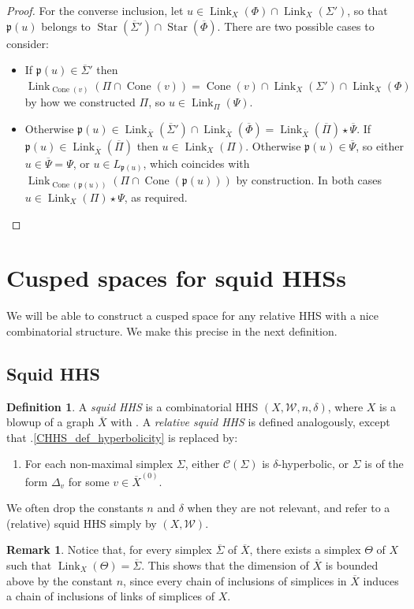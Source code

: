 \documentclass[svgnames]{amsart}
\theoremstyle{plain}
\theoremstyle{definition}
\newtheorem{defn}[thm]{Definition}
\newtheorem{rem}[thm]{Remark}
\newcommand{\C}[1]{\mathcal{C}(#1)}
\newcommand{\link}[2]{\operatorname{Link}_{#1}\left(#2\right)}
\newcommand{\W}{\mathcal{W}}
\newcommand{\CStar}[1]{\operatorname{Star}\left(#1\right)}
\newcommand{\p}{\mathfrak{p}}
\newcommand{\Cone}[1]{\operatorname{Cone}\left(#1\right)}
\newcommand{\squid}[1]{squid}
\newcommand{\Squid}[1]{Squid}
\newcommand{\ov}[1]{\overline{#1}}
\begin{document}
\begin{proof}
For the converse inclusion, let $u\in \link{X}{\Phi}\cap\link{X}{\Sigma'}$, so that $\p(u)$ belongs to $\CStar { \ov \Sigma'}\cap \CStar { \ov \Phi}$. There are two possible cases to consider:
\begin{itemize}
    \item If $\p(u)\in \ov \Sigma'$ then $\link{\Cone{v}}{\Pi\cap \Cone{v}}=\Cone{v}\cap\link{X}{\Sigma'}\cap\link{X}{\Phi}$ by how we constructed $\Pi$, so $u\in \link{\Pi}{\Psi}$.
    \item Otherwise $\p(u)\in  \link{\ov X}{\ov \Sigma'}\cap \link{\ov X}{\ov \Phi}=\link{\ov X}{\ov \Pi}\star\ov\Psi$. If $\p(u)\in \link{\ov X}{\ov \Pi}$ then $u\in \link{X}{\Pi}$. Otherwise $\p(u)\in\ov\Psi$, so either $u\in \ov\Psi=\Psi$, or $u\in L_{\p(u)}$, which coincides with $\link{\Cone{\p(u)}}{\Pi\cap \Cone{\p(u)}}$ by construction. In both cases $u\in \link{X}{\Pi}\star \Psi$, as required. \qedhere
\end{itemize}
\end{proof}



\section{Cusped spaces for \squid{} HHSs}
\label{sec:squid}
We will be able to construct a cusped space for any relative HHS with a nice combinatorial structure. We make this precise in the next definition.

\subsection{\Squid{} HHS}
\begin{defn}\label{defn:rel_squid_HHS}
A \emph{\squid{} HHS} is a combinatorial HHS $(X,\W,n,\delta)$, where $X$ is a blowup of a graph $\ov X$ with \cleanish{}. A \emph{relative \squid{} HHS} is defined analogously, except that .\ref{CHHS_def_hyperbolicity} is replaced by:
\begin{enumerate}[start=2, label = (\arabic*{}')]
\item \label{CHHS_def_rel_hyperbolicity} For each non-maximal simplex $\Sigma$, either $\C{\Sigma}$ is $\delta$-hyperbolic, or $\Sigma$ is of the form $\Delta_v$ for some $v\in \ov X^{(0)}$.
\end{enumerate}
We often drop the constants $n$ and $\delta$ when they are not relevant, and refer to a (relative) \squid{} HHS simply by $(X,\W)$. 
\end{defn}
\begin{rem}\label{rem:dimension_of_ovX}
    Notice that, for every simplex $\ov\Sigma$ of $\ov X$, there exists a simplex $\Theta$ of $X$ such that $\link{X}{\Theta}=\ov\Sigma$. This shows that the dimension of $\ov X$ is bounded above by the constant $n$, since every chain of inclusions of simplices in $\ov X$ induces a chain of inclusions of links of simplices of $X$.
\end{rem}
\end{document}
